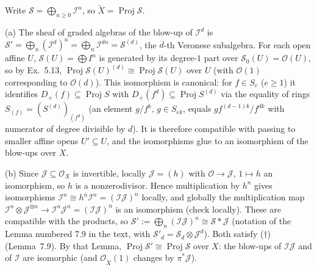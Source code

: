 \documentclass[11pt]{article}
\begin{document}
\pf
Write $\mathcal S=\bigoplus_{n\ge0}\mathcal I^n$, so $\tilde X=\operatorname{Proj}\mathcal S$.

(a) The sheaf of graded algebras of the blow-up of $\mathcal I^d$ is $\mathcal S'=\bigoplus_n(\mathcal I^d)^n=\bigoplus_n\mathcal I^{dn}=\mathcal S^{(d)}$, the $d$-th Veronese subalgebra. For each open affine $U$, $\mathcal S(U)=\bigoplus I^n$ is generated by its degree-$1$ part over $\mathcal S_0(U)=\mathcal O(U)$, so by Ex.~5.13, $\operatorname{Proj}\mathcal S(U)^{(d)}\cong\operatorname{Proj}\mathcal S(U)$ over $U$ (with $\mathcal O(1)$ corresponding to $\mathcal O(d)$). This isomorphism is canonical: for $f\in S_e$ ($e\ge1$) it identifies $D_+(f)\subseteq\operatorname{Proj}S$ with $D_+(f^d)\subseteq\operatorname{Proj}S^{(d)}$ via the equality of rings $S_{(f)}=(S^{(d)})_{(f^d)}$ (an element $g/f^k$, $g\in S_{ek}$, equals $gf^{(d-1)k}/f^{dk}$ with numerator of degree divisible by $d$). It is therefore compatible with passing to smaller affine opens $U'\subseteq U$, and the isomorphisms glue to an isomorphism of the blow-ups over $X$.

(b) Since $\mathcal J\subseteq\mathcal O_X$ is invertible, locally $\mathcal J=(h)$ with $\mathcal O\to\mathcal J$, $1\mapsto h$ an isomorphism, so $h$ is a nonzerodivisor. Hence multiplication by $h^n$ gives isomorphisms $\mathcal I^n\cong h^n\mathcal I^n=(\mathcal I\mathcal J)^n$ locally, and globally the multiplication map $\mathcal I^n\otimes\mathcal J^{\otimes n}\to\mathcal I^n\mathcal J^n=(\mathcal I\mathcal J)^n$ is an isomorphism (check locally). These are compatible with the products, so $\mathcal S':=\bigoplus_n(\mathcal I\mathcal J)^n\cong\mathcal S*\mathcal J$ (notation of the Lemma numbered 7.9 in the text, with $\mathcal S'_d=\mathcal S_d\otimes\mathcal J^d$). Both satisfy ($\dagger$) (Lemma~7.9). By that Lemma, $\operatorname{Proj}\mathcal S'\cong\operatorname{Proj}\mathcal S$ over $X$: the blow-ups of $\mathcal I\mathcal J$ and of $\mathcal I$ are isomorphic (and $\mathcal O_{\tilde X}(1)$ changes by $\pi^*\mathcal J$).
\end{document}
